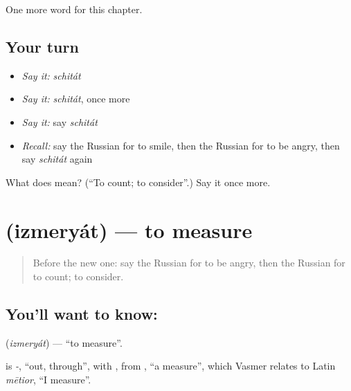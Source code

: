 \begin{grammarlens}[title={What you've built}]
One more word for this chapter.
\end{grammarlens}

\subsection*{Your turn}
\begin{itemize}
\raggedright
  \item \emph{Say it:} \emph{schitát}
  \item \emph{Say it:} \emph{schitát}, once more
  \item \emph{Say it:} say \emph{schitát}
  \item \emph{Recall:} say the Russian for to smile, then the Russian for to be angry, then say \emph{schitát} again
\end{itemize}

\begin{tcolorbox}[breakable,colback=teal!4,colframe=teal!35!black,title={Before you move on}]
What does  mean? (\textquotedblleft{}To count; to consider\textquotedblright{}.) Say it once more.
\end{tcolorbox}
\section[\texorpdfstring{\ru{измерять} (izmeryát)}{измерять (izmeryát)}]{ (izmeryát) — to measure}

\label{lesson:RU-C236-izmeryat}



\begin{quote}
Before the new one: say the Russian for to be angry, then the Russian for to count; to consider.
\end{quote}

\subsection*{You'll want to know: }
\textbf{} (\emph{izmeryát}) — \textquotedblleft{}to measure\textquotedblright{}.

\begin{cousinweb}
\textbf{} is \emph{-}, \textquotedblleft{}out, through\textquotedblright{}, with \emph{}, from \emph{}, \textquotedblleft{}a measure\textquotedblright{}, which Vasmer relates to Latin \emph{mētior}, \textquotedblleft{}I measure\textquotedblright{}.
\end{cousinweb}

